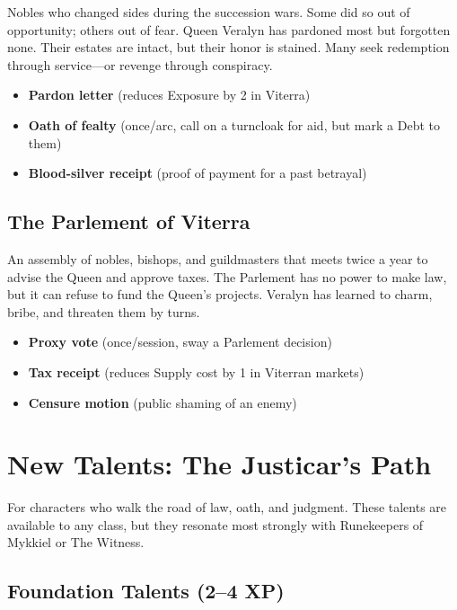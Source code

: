 \documentclass[11pt,twoside]{book}
\newenvironment{sidebar}[1][]
{\begin{tcolorbox}[colback=agedpaper,colframe=royalblue,boxrule=0.5pt,arc=2mm,title={\scshape\small #1},fonttitle=\bfseries]}
{\end{tcolorbox}}
\begin{document}
Nobles who changed sides during the succession wars. Some did so out of opportunity; others out of fear. Queen Veralyn has pardoned most but forgotten none. Their estates are intact, but their honor is stained. Many seek redemption through service---or revenge through conspiracy.

\begin{sidebar}[Strings]
\begin{itemize}
    \item \textbf{Pardon letter} (reduces Exposure by 2 in Viterra)
    \item \textbf{Oath of fealty} (once/arc, call on a turncloak for aid, but mark a Debt to them)
    \item \textbf{Blood-silver receipt} (proof of payment for a past betrayal)
\end{itemize}
\end{sidebar}

\section{The Parlement of Viterra}

An assembly of nobles, bishops, and guildmasters that meets twice a year to advise the Queen and approve taxes. The Parlement has no power to make law, but it can refuse to fund the Queen's projects. Veralyn has learned to charm, bribe, and threaten them by turns.

\begin{sidebar}[Strings]
\begin{itemize}
    \item \textbf{Proxy vote} (once/session, sway a Parlement decision)
    \item \textbf{Tax receipt} (reduces Supply cost by 1 in Viterran markets)
    \item \textbf{Censure motion} (public shaming of an enemy)
\end{itemize}
\end{sidebar}

\chapter{New Talents: The Justicar's Path}

For characters who walk the road of law, oath, and judgment. These talents are available to any class, but they resonate most strongly with Runekeepers of Mykkiel or The Witness.

\section{Foundation Talents (2--4 XP)}
\end{document}
